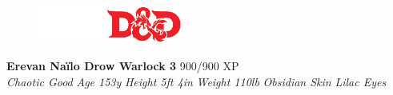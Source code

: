 \documentclass[letterpaper]{article}
\newcommand{\e}[1]{\emph{#1}}
\newcommand{\B}[1]{\textbf{#1}}
\begin{document}
\sffamily
\begin{figure}
    \vspace{-1.5em}
    \includegraphics[width=13em]{5e}
\end{figure}
\B{\huge{Erevan Na\"ilo} \Large{Drow Warlock 3}} \hspace{1em} 900/900 XP \\
\e{Chaotic Good} \hspace{1em} \e{Age 153y} \hspace{1em} \e{Height 5ft 4in} \hspace{1em} \e{Weight 110lb} \hspace{1em} \e{Obsidian Skin} \hspace{1em} \e{Lilac Eyes} \par
\end{document}
